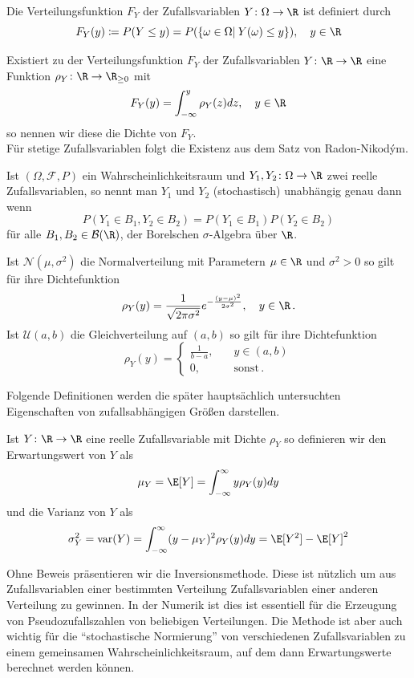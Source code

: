\begin{mathdef}[Verteilungsfunktion]
Die Verteilungsfunktion $F_Y$ der Zufallsvariablen $Y\colon\Omega\to\R$ ist definiert durch
\[F_Y(y)\coloneqq P(Y\le y)=P(\left\lbrace \omega\in\Omega |\: Y(\omega)\le y\right\rbrace),\quad y\in\R\]
\end{mathdef}
\begin{mathdef}
Existiert zu der Verteilungsfunktion $F_Y$ der Zufallsvariablen $Y\colon\R\to\R$ eine Funktion $\rho_Y\colon\R\to\R_{\ge 0}$ mit
\[F_Y(y)=\int_{-\infty}^y\rho_Y(z)dz,\quad y\in\R\]
so nennen wir diese die Dichte von $F_Y$.\\
Für stetige Zufallsvariablen folgt die Existenz aus dem Satz von Radon-Nikodým.
\end{mathdef}
\begin{mathdef}
Ist $(\Omega,\mathcal{F},P)$ ein Wahrscheinlichkeitsraum und $Y_1, Y_2\colon \Omega\to\R$ zwei reelle Zufallsvariablen, so nennt man $Y_1$ und $Y_2$ (stochastisch) unabhängig genau dann wenn
\[P(Y_1\in B_1,Y_2\in B_2)=P(Y_1\in B_1)P(Y_2\in B_2)\]
für alle $B_1,B_2\in \mathcal{B}(\R)$, der Borelschen $\sigma$-Algebra über $\R$.
\end{mathdef}
\begin{mathbsp}
Ist $\mathcal{N}(\mu, \sigma^2)$ die Normalverteilung mit Parametern $\mu\in\R$ und $\sigma^2>0$ so gilt für ihre Dichtefunktion
\[\rho_Y(y)=\frac{1}{\sqrt{2\pi\sigma^2}}e^{-\frac{(y-\mu)^2}{2\sigma^2}},\quad y\in\R\,.\]
Ist $\mathcal{U}(a,b)$ die Gleichverteilung auf $(a,b)$ so gilt für ihre Dichtefunktion
\[\rho_Y(y)=\begin{cases}\frac{1}{b-a},\quad &y\in (a,b)\\ 0, \quad &\text{sonst}\,. \end{cases}\]
\end{mathbsp}
Folgende Definitionen werden die später hauptsächlich untersuchten Eigenschaften von zufallsabhängigen Größen darstellen.
\begin{mathdef}
Ist $Y\colon\R\to\R$ eine reelle Zufallsvariable mit Dichte $\rho_Y$ so definieren wir den Erwartungswert von $Y$ als
\[\mu_Y=\E[Y]=\int_{-\infty}^\infty y\rho_Y(y)dy\]
und die Varianz von $Y$ als 
\[\sigma_Y^2=\text{var}(Y)=\int_{-\infty}^\infty (y-\mu_Y)^2\rho_Y(y)dy=\E[Y^2]-\E[Y]^2\]
\end{mathdef}
Ohne Beweis präsentieren wir die Inversionsmethode. Diese ist nützlich um aus Zufallsvariablen einer bestimmten Verteilung Zufallsvariablen einer anderen Verteilung zu gewinnen. In der Numerik ist dies ist essentiell für die Erzeugung von Pseudozufallszahlen von beliebigen Verteilungen. Die Methode ist aber auch wichtig für die "`stochastische Normierung"' von verschiedenen Zufallsvariablen zu einem gemeinsamen Wahrscheinlichkeitsraum, auf dem dann Erwartungswerte berechnet werden können.
